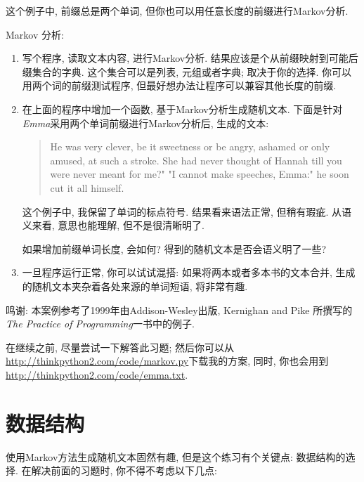 \documentclass[10pt]{book}
\begin{document}
这个例子中, 前缀总是两个单词, 但你也可以用任意长度的前缀进行Markov分析. 

\begin{exercise}

Markov 分析:

\begin{enumerate}

\item 写个程序, 读取文本内容, 进行Markov分析. 
结果应该是个从前缀映射到可能后缀集合的字典. 
这个集合可以是列表, 元组或者字典; 取决于你的选择. 
你可以用两个词的前缀测试程序, 但最好想办法让程序可以兼容其他长度的前缀. 

\item 在上面的程序中增加一个函数, 基于Markov分析生成随机文本. 
下面是针对 {\em Emma}采用两个单词前缀进行Markov分析后, 生成的文本:

\begin{quote}
He was very clever, be it sweetness or be angry, ashamed or only
amused, at such a stroke. She had never thought of Hannah till you
were never meant for me?" "I cannot make speeches, Emma:" he soon cut
it all himself.
\end{quote}

这个例子中, 我保留了单词的标点符号. 
结果看来语法正常, 但稍有瑕疵. 
从语义来看, 意思也能理解, 但不是很清晰明了. 

如果增加前缀单词长度, 会如何? 得到的随机文本是否会语义明了一些?

\item 一旦程序运行正常, 你可以试试混搭: 
如果将两本或者多本书的文本合并, 生成的随机文本夹杂着各处来源的单词短语, 将非常有趣. 

\end{enumerate}

鸣谢: 本案例参考了1999年由Addison-Wesley出版, Kernighan and Pike
所撰写的{\em The Practice of Programming}一书中的例子. 
\end{exercise}

在继续之前, 尽量尝试一下解答此习题; 然后你可以从 
\url{http://thinkpython2.com/code/markov.py}下载我的方案, 同时, 
你也会用到\url{http://thinkpython2.com/code/emma.txt}.


\section{数据结构}

使用Markov方法生成随机文本固然有趣, 但是这个练习有个关键点:
数据结构的选择. 在解决前面的习题时, 你不得不考虑以下几点:
\end{document}
